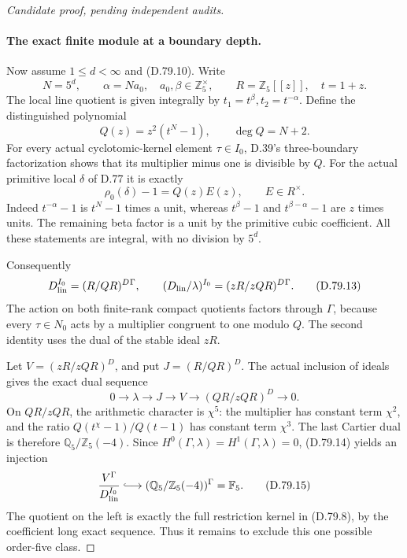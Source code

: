 \begin{proof}[Candidate proof, pending independent audits]
\paragraph{The exact finite module at a boundary depth.}
Now assume \(1\le d<\infty\) and (D.79.10). Write
\[
 N=5^d,\qquad \alpha=N a_0,
 \quad a_0,\beta\in\mathbb Z_5^\times,
 \qquad R=\mathbb Z_5[[z]],\quad t=1+z.
\]
The local line quotient is given integrally by
\(t_1=t^\beta,t_2=t^{-\alpha}\). Define the distinguished
polynomial
\[
 Q(z)=z^2(t^N-1),\qquad \deg Q=N+2.                   \tag{D.79.11}
\]
For every actual cyclotomic-kernel element \(\tau\in I_0\),
D.39's three-boundary factorization shows that its multiplier
minus one is divisible by \(Q\). For the actual primitive
local \(\delta\) of D.77 it is exactly
\[
                   \rho_0(\delta)-1=Q(z)E(z),
                          \qquad E\in R^\times.        \tag{D.79.12}
\]
Indeed \(t^{-\alpha}-1\) is \(t^N-1\) times a unit,
whereas \(t^\beta-1\) and \(t^{\beta-\alpha}-1\)
are \(z\) times units. The remaining beta factor is a unit
by the primitive cubic coefficient. All these statements are
integral, with no division by \(5^d\).

Consequently
\[
 D_{\rm lin}^{I_0}=(R/QR)^D{}^{\Gamma},\qquad
 (D_{\rm lin}/\lambda)^{I_0}
                    =(zR/zQR)^D{}^{\Gamma}.           \tag{D.79.13}
\]
The action on both finite-rank compact quotients factors
through \(\Gamma\), because every \(\tau\in N_0\)
acts by a multiplier congruent to one modulo \(Q\).
The second identity uses the dual of the stable ideal \(zR\).

Let \(V=(zR/zQR)^D\), and put \(J=(R/QR)^D\).
The actual inclusion of ideals gives the exact dual sequence
\[
 0\longrightarrow\lambda\longrightarrow J
       \longrightarrow V
       \longrightarrow (QR/zQR)^D\longrightarrow0.
                                                               \tag{D.79.14}
\]
On \(QR/zQR\), the arithmetic character is \(\chi^5\):
the multiplier has constant term \(\chi^2\), and the
ratio \(Q(t^\chi-1)/Q(t-1)\) has constant term \(\chi^3\).
The last Cartier dual is therefore
\(\mathbb Q_5/\mathbb Z_5(-4)\). Since
\(H^0(\Gamma,\lambda)=H^1(\Gamma,\lambda)=0\),
(D.79.14) yields an injection
\[
 \frac{V^\Gamma}{D_{\rm lin}^{I_0}}
       \lhook\joinrel\longrightarrow
 (\mathbb Q_5/\mathbb Z_5(-4))^\Gamma
                    =\mathbb F_5.                    \tag{D.79.15}
\]
The quotient on the left is exactly the full restriction
kernel in (D.79.8), by the coefficient long exact sequence.
Thus it remains to exclude this one possible order-five class.


\end{proof}
